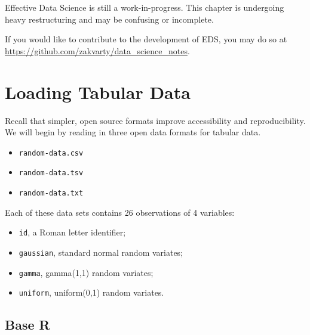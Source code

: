 \documentclass[
  letterpaper,
  DIV=11,
  numbers=noendperiod]{scrreprt}
\providecommand{\tightlist}{%
  \setlength{\itemsep}{0pt}\setlength{\parskip}{0pt}}\usepackage{longtable,booktabs,array}
\begin{document}
\begin{tcolorbox}[enhanced jigsaw, leftrule=.75mm, bottomtitle=1mm, toprule=.15mm, colbacktitle=quarto-callout-important-color!10!white, breakable, colback=white, bottomrule=.15mm, opacityback=0, colframe=quarto-callout-important-color-frame, title=\textcolor{quarto-callout-important-color}{\faExclamation}\hspace{0.5em}{Important}, titlerule=0mm, toptitle=1mm, opacitybacktitle=0.6, arc=.35mm, rightrule=.15mm, coltitle=black, left=2mm]

Effective Data Science is still a work-in-progress. This chapter is
undergoing heavy restructuring and may be confusing or incomplete.

If you would like to contribute to the development of EDS, you may do so
at \url{https://github.com/zakvarty/data_science_notes}.

\end{tcolorbox}

\section{Loading Tabular Data}\label{loading-tabular-data}

Recall that simpler, open source formats improve accessibility and
reproducibility. We will begin by reading in three open data formats for
tabular data.

\begin{itemize}
\item
  \texttt{random-data.csv}
\item
  \texttt{random-data.tsv}
\item
  \texttt{random-data.txt}
\end{itemize}

Each of these data sets contains 26 observations of 4 variables:

\begin{itemize}
\tightlist
\item
  \texttt{id}, a Roman letter identifier;
\item
  \texttt{gaussian}, standard normal random variates;
\item
  \texttt{gamma}, gamma(1,1) random variates;
\item
  \texttt{uniform}, uniform(0,1) random variates.
\end{itemize}

\subsection{Base R}\label{base-r}
\end{document}
